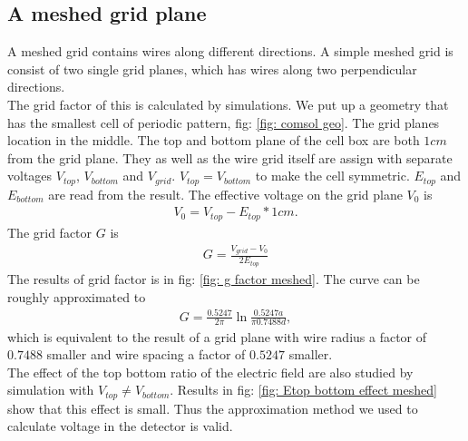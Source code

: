 
\subsection{A meshed grid plane}
A meshed grid contains wires along different directions. A simple meshed grid is consist of two single grid planes, which has wires along two perpendicular directions. \\
The grid factor of this is calculated by simulations. We put up a geometry that has the smallest cell of periodic pattern, fig: \ref{fig: comsol geo}.
The grid planes location in the middle. The top and bottom plane of the cell box are both $1 cm$ from the grid plane. They as well as the wire grid itself are assign with separate voltages $V_{top}$, $V_{bottom}$ and $V_{grid}$. $V_{top} = V_{bottom}$ to make the cell symmetric. $E_{top}$ and $E_{bottom}$ are read from the result. The effective voltage on the grid plane $V_{0}$ is
\begin{align}
V_{0}= V_{top}- E_{top}* 1 cm.
\end{align}
The grid factor $G$ is
\begin{align}
G = \frac{V_{grid}-V_0}{2 E_{top}}
\end{align}
The results of grid factor is in fig: \ref{fig: g factor meshed}. The curve can be roughly approximated to 
\begin{align}
G = \frac{0.5247}{2 \pi} \ln \frac{0.5247 a}{\pi 0.7488 d},
\end{align}
which is equivalent to the result of a grid plane with wire radius a factor of $0.7488$ smaller and wire spacing a factor of $0.5247$ smaller.\\
The effect of the top bottom ratio of the electric field are also studied by simulation with $V_{top} \neq V_{bottom}$. Results in fig: \ref{fig: Etop bottom effect meshed} show that this effect is small. Thus the approximation method we used to calculate voltage in the detector is valid. 
